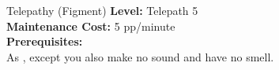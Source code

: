 {Telepathy (Figment)}
{
    \textbf{Level:}
    Telepath 5\\
    \textbf{Maintenance Cost:}
    5 pp/minute\\
    \textbf{Prerequisites:}
    \\
}
{
    As , except you also make no sound and have no smell.
}

